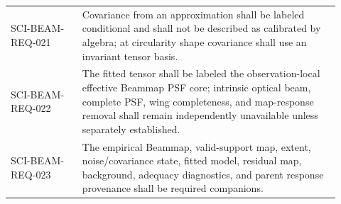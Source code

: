 \begin{longtable}{>{\raggedright\arraybackslash\ttfamily\scriptsize}p{0.20\linewidth}L{0.72\linewidth}}
SCI-BEAM-REQ-021 & Covariance from an approximation shall be labeled conditional and shall not be described as calibrated by algebra; at circularity shape covariance shall use an invariant tensor basis. \\
SCI-BEAM-REQ-022 & The fitted tensor shall be labeled the observation-local effective Beammap PSF core; intrinsic optical beam, complete PSF, wing completeness, and map-response removal shall remain independently unavailable unless separately established. \\
SCI-BEAM-REQ-023 & The empirical Beammap, valid-support map, extent, noise/covariance state, fitted model, residual map, background, adequacy diagnostics, and parent response provenance shall be required companions. \\
\bottomrule
\end{longtable}
\clearpage
